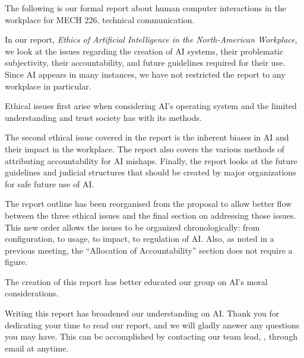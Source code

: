 \documentclass{letter}
\title{}
\author{\protect\censor{AAAAAAAAAAAAAA}| \protect\censor{AAAAAAAAAAAA}| \protect\censor{AAAAAAAAAAA}| \protect\censor{AAAAAAAAAAAA}}
\date{December 6, 2017}
\begin{document}
\maketitle

The following is our formal report about human computer interactions in the workplace for  MECH 226, technical communication. 

In our report, \emph{Ethics of Artificial Intelligence in the North-American Workplace}, we look at the issues regarding the creation of AI systems, their problematic subjectivity, their accountability, and future guidelines required for their use. 
Since AI appears in many instances, we have not restricted the report to any workplace in particular.

Ethical issues first arise when considering AI’s operating system and the limited understanding and trust society has with its methods. 

The second ethical issue covered in the report is the inherent biases in AI and their impact in the workplace. 
The report also covers the various methods of attributing accountability for AI mishaps. 
Finally, the report looks at the future guidelines and judicial structures that should be created by major organizations for safe future use of AI. 

The report outline has been reorganised from the proposal to allow better flow between the three ethical issues and the final section on addressing those issues. 
This new order allows the issues to be organized chronologically: from configuration, to usage, to impact, to regulation of AI. 
Also, as noted in a previous meeting, the “Allocation of Accountability” section does not require a figure. 

The creation of this report has better educated our group on AI’s moral considerations. 

Writing this report has broadened our understanding on AI. 
Thank you for dedicating your time to read our report, and we will gladly answer any questions you may have. 
This can be accomplished by contacting our team lead, , through email at  anytime. 

\makeend
\end{document}
